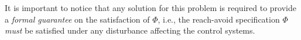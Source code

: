 \begin{comment}
\begin{description}
	\item[Inputs:] Control systems $\Sigma^i=(X^i,x_\init^i,U^i,W^i,f^i)$, $i\in [1;N]$, and the global specification $\Phi=\lnot\avoid\,\mathcal{U}\,\goal$.%
	\item[Parameters:] A robustness margin $\varepsilon\in \reals^n_{>0}$.%
	\item[Output:] Local feedback controllers $\set{C^i}$ for $\set{\Sigma^i}$, $i\in [1;N]$, such that $\set{C^i}\parallel \set{\Sigma^i}$ realizes $\Phi$. 
\end{description}
\end{comment}

It is important to notice that any solution for this problem is required to provide a \emph{formal guarantee} on the satisfaction of $\Phi$, 
i.e., the reach-avoid specification $\Phi$ \emph{must} be satisfied under any disturbance affecting the control systems. 

